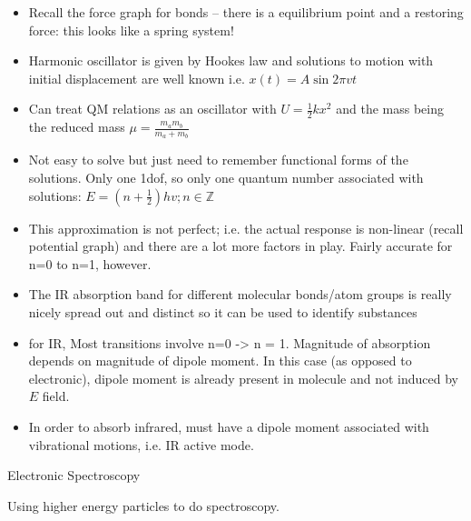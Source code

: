 \documentclass[10pt]{article}
\begin{document}
\begin{itemize}
	\item Recall the force graph for bonds -- there is a equilibrium point and a restoring force: this looks like a spring system!
	\item Harmonic oscillator is given by Hookes law and solutions to motion with initial displacement are well known i.e. $ x(t) = A \sin{2 \pi v t}$ 
	\item Can treat QM relations as an oscillator with $ U = \frac{1}{2}kx^2 $ and the mass being the reduced mass $ \mu = \frac{m_a m_b}{ m_a + m_b } $
	\item Not easy to solve but just need to remember functional forms of the solutions. Only one 1dof, so only one quantum number associated with solutions: $ E = (n+\frac{1}{2})hv; n \in \mathbb{Z}$  
	\item This approximation is not perfect; i.e. the actual response is non-linear (recall potential graph) and there are a lot more factors in play. Fairly accurate for n=0 to n=1, however.
	\item The IR absorption band for different molecular bonds/atom groups is really nicely spread out and distinct so it can be used to identify substances
	\item for IR, Most transitions involve n=0 -> n = 1. Magnitude of absorption depends on magnitude of dipole moment. In this case (as opposed to electronic), dipole moment is already present in molecule and not induced by $ E $ field.
	\item In order to absorb infrared, must have a dipole moment associated with vibrational motions, i.e. IR active mode.


\end{itemize}

Electronic Spectroscopy

Using higher energy particles to do spectroscopy.
\end{document}
